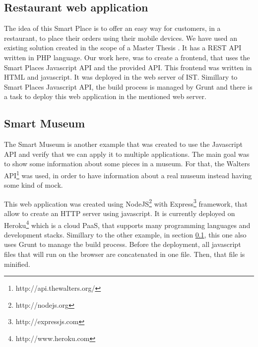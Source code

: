 \subsection{Restaurant web application}
\label{sub:restaurant_web_application}
The idea of this Smart Place is to offer an easy way for customers, in a restaurant, to place their orders using their mobile devices.
We have used an existing solution created in the scope of a Master Thesis \cite{SLOC}.
It has a \gls{REST} \gls{API} written in \gls{PHP} language.
Our work here, was to create a frontend, that uses the Smart Places Javascript \gls{API} and the provided \gls{API}.
This frontend was written in \gls{HTML} and javascript.
It was deployed in the web server of \gls{IST}. Simillary to Smart Places Javascript \gls{API}, the build process is managed by Grunt and there is a task to deploy this web application in the mentioned web server.

\subsection{Smart Museum}
\label{sub:smart_museum}
The Smart Museum is another example that was created to use the Javascript API and verify that we can apply it to multiple applications.
The main goal was to show some information about some pieces in a museum. For that, the Walters \gls{API}\footnote{http://api.thewalters.org/} was used, in order to have information about a real museum instead having some kind of mock.

This web application was created using NodeJS\footnote{http://nodejs.org} with Express\footnote{http://expressjs.com} framework, that allow to create an \gls{HTTP} server using javascript.
It is currently deployed on Heroku\footnote{http://www.heroku.com} which is a cloud \gls{PaaS}, that supports many programming languages and development stacks.
Simillary to the other example, in section \ref{sub:restaurant_web_application}, this one also uses Grunt to manage the build process. Before the deployment, all javascript files that will run on the browser are concatenated in one file. Then, that file is minified.

